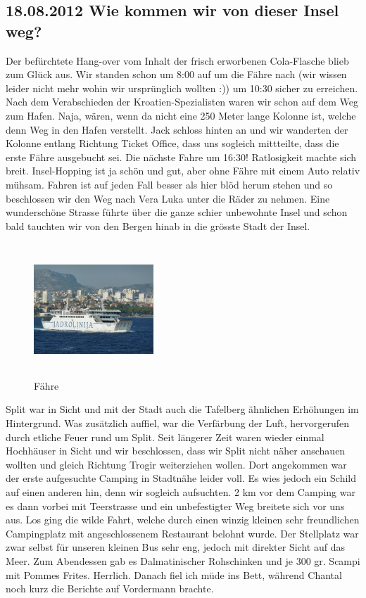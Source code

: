 \subsection{18.08.2012 Wie kommen wir von dieser Insel weg?}
Der befürchtete Hang-over vom Inhalt der frisch erworbenen Cola-Flasche blieb zum Glück aus.
Wir standen schon um 8:00 auf um die Fähre nach (wir wissen leider nicht mehr wohin wir ursprünglich wollten :)) um 10:30 sicher zu erreichen.
Nach dem Verabschieden der Kroatien-Spezialisten waren wir schon auf dem Weg zum Hafen.
Naja, wären, wenn da nicht eine 250 Meter lange Kolonne ist, welche denn Weg in den Hafen verstellt.
Jack schloss hinten an und wir wanderten der Kolonne entlang Richtung Ticket Office, dass uns sogleich mittteilte, dass die erste Fähre ausgebucht sei.
Die nächste Fahre um 16:30! Ratlosigkeit machte sich breit.
Insel-Hopping ist ja schön und gut, aber ohne Fähre mit einem Auto relativ mühsam.
Fahren ist auf jeden Fall besser als hier blöd herum stehen und so beschlossen wir den Weg nach Vera Luka unter die Räder zu nehmen.
Eine wunderschöne Strasse führte über die ganze schier unbewohnte Insel und schon bald tauchten wir von den Bergen hinab in die grösste Stadt der Insel.

\begin{figure} 
  \begin{centering}
    \includegraphics[width=0.4\textwidth, height=5cm, keepaspectratio]{../Bilder/Sommer2012/76.jpg}
    \caption{Fähre}
  \end{centering}
\end{figure} 

Split war in Sicht und mit der Stadt auch die Tafelberg ähnlichen Erhöhungen im Hintergrund.
Was zusätzlich auffiel, war die Verfärbung der Luft, hervorgerufen durch etliche Feuer rund um Split.
Seit längerer Zeit waren wieder einmal Hochhäuser in Sicht und wir beschlossen, dass wir Split nicht näher anschauen wollten und gleich Richtung Trogir weiterziehen wollen.
Dort angekommen war der erste aufgesuchte Camping in Stadtnähe leider voll.
Es wies jedoch ein Schild auf einen anderen hin, denn wir sogleich aufsuchten.
2 km vor dem Camping war es dann vorbei mit Teerstrasse und ein unbefestigter Weg breitete sich vor uns aus.
Los ging die wilde Fahrt, welche durch einen winzig kleinen sehr freundlichen Campingplatz mit angeschlossenem Restaurant belohnt wurde.
Der Stellplatz war zwar selbst für unseren kleinen Bus sehr eng, jedoch mit direkter Sicht auf das Meer.
Zum Abendessen gab es Dalmatinischer Rohschinken und je 300 gr. Scampi mit Pommes Frites.
Herrlich.
Danach fiel ich müde ins Bett, während Chantal noch kurz die Berichte auf Vordermann brachte.

